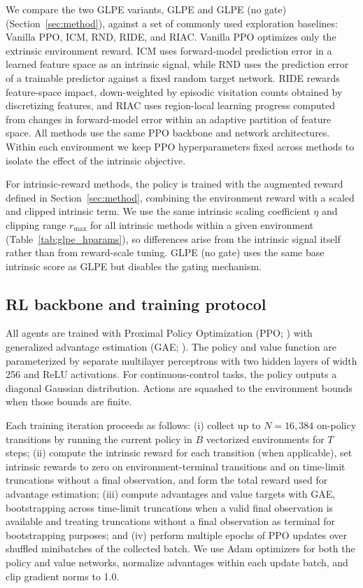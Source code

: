 We compare the two GLPE variants, GLPE and GLPE (no gate) (Section~\ref{sec:method}), against a set of commonly used exploration baselines: Vanilla PPO, ICM, RND, RIDE, and RIAC.
Vanilla PPO optimizes only the extrinsic environment reward.
ICM uses forward-model prediction error in a learned feature space as an intrinsic signal, while RND uses the prediction error of a trainable predictor against a fixed random target network.
RIDE rewards feature-space impact, down-weighted by episodic visitation counts obtained by discretizing features, and RIAC uses region-local learning progress computed from changes in forward-model error within an adaptive partition of feature space.
All methods use the same PPO backbone and network architectures.
Within each environment we keep PPO hyperparameters fixed across methods to isolate the effect of the intrinsic objective.

For intrinsic-reward methods, the policy is trained with the augmented reward defined in Section~\ref{sec:method}, combining the environment reward with a scaled and clipped intrinsic term.
We use the same intrinsic scaling coefficient $\eta$ and clipping range $r_{\max}$ for all intrinsic methods within a given environment (Table~\ref{tab:glpe_hparams}), so differences arise from the intrinsic signal itself rather than from reward-scale tuning.
GLPE (no gate) uses the same base intrinsic score as GLPE but disables the gating mechanism.



\subsection{RL backbone and training protocol}
\label{sec:experimental_setup:training}

All agents are trained with Proximal Policy Optimization (PPO; \cite{schulman-2017}) with generalized advantage estimation (GAE; \cite{schulman-2015}).
The policy and value function are parameterized by separate multilayer perceptrons with two hidden layers of width 256 and ReLU activations.
For continuous-control tasks, the policy outputs a diagonal Gaussian distribution.
Actions are squashed to the environment bounds when those bounds are finite.

Each training iteration proceeds as follows:
(i) collect up to $N=16{,}384$ on-policy transitions by running the current policy in $B$ vectorized environments for $T$ steps;
(ii) compute the intrinsic reward for each transition (when applicable), set intrinsic rewards to zero on environment-terminal transitions and on time-limit truncations without a final observation, and form the total reward used for advantage estimation;
(iii) compute advantages and value targets with GAE, bootstrapping across time-limit truncations when a valid final observation is available and treating truncations without a final observation as terminal for bootstrapping purposes; and
(iv) perform multiple epochs of PPO updates over shuffled minibatches of the collected batch.
We use Adam optimizers for both the policy and value networks, normalize advantages within each update batch, and clip gradient norms to 1.0.

